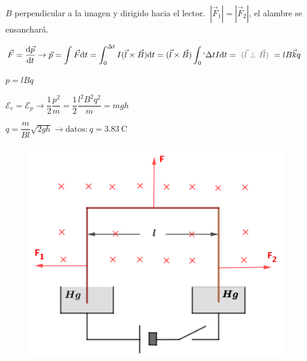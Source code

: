\begin{multicols}{2}
$B$ perpendicular a la imagen y dirigido hacia el lector.
$\ |\vec F_1|=|\vec F_2|$, el alambre se ensanchará.

$\vec F=\displaystyle \dv{\vec p}{t} \to \vec p=\int \vec F \dd t= \int_0^{\Delta t} I(\vec l \times \vec B)\dd t=(\vec l \times \vec B) \int_0`{\Delta t} I \dd t = \textcolor{gris}{ \ (\vec l \ \bot \ \vec B) \ }= l B \vec k q$

$p=lBq$

$\mathcal E_c=\mathcal E_p \to  \dfrac 1 2 \dfrac {p^2}m=\dfrac{1}{2}\dfrac{l^2B^2q^2}{m}=mgh$


$q=\dfrac {m}{Bl} \sqrt{2 g h} \to \text{datos:}\ q=3.83\ \mathrm{C}$
\begin{figure}[H]
	\centering
	\includegraphics[width=.5\textwidth]{imagenes/imagenes26/T26IM21.png}
	\end{figure}	
\end{multicols}
	

